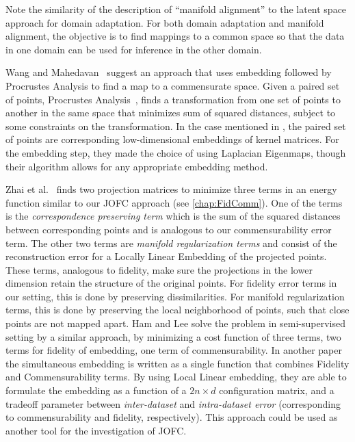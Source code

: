 \documentclass[12pt,oneside,final]{thesis}\usepackage[]{graphicx}\usepackage[]{color}
\begin{document}
Note the similarity of the  description of ``manifold alignment''   to the latent space approach for domain adaptation. For both domain adaptation and manifold alignment, the objective is to find mappings to a  common space  so that the data in  one domain can be used for inference in the other domain.

Wang and Mahedavan~\cite{Wang2008} suggest an  approach that uses embedding followed by Procrustes Analysis to find a map to a commensurate space. Given a paired set of points, Procrustes Analysis~\cite{Sibson}, finds a transformation from one set of points to another in the same space that minimizes sum of squared distances, subject to some constraints on the transformation. In the case mentioned in \cite{Wang2008}, the paired set of points are corresponding low-dimensional embeddings of kernel matrices.   For the embedding step, they made the choice of using Laplacian Eigenmaps, though their algorithm allows for any appropriate embedding method.

 Zhai et al.~\cite{Zhai2010}  finds two projection matrices to minimize three terms in an energy function similar to our JOFC approach (see \autoref{chap:FidComm}). One of the terms is the \emph{correspondence preserving term} which is the sum of the squared distances between corresponding points and is analogous to our commensurability error term. The other two terms are \emph{manifold regularization terms} and consist of the reconstruction error for a Locally Linear Embedding of the projected points. These terms, analogous to fidelity, make sure the projections in the lower dimension retain the structure of the original points. For fidelity error terms in our setting, this is done by preserving dissimilarities. For manifold regularization terms, this is done by preserving the local neighborhood of points, such that close points are not mapped apart.
Ham and Lee\cite{HamLee2005a} solve the problem in semi-supervised setting by a similar approach, by minimizing a cost function of three terms, two terms for fidelity of embedding, one term of commensurability.
In another paper  the simultaneous embedding is written  as a single function  that combines Fidelity and Commensurability terms. By using Local Linear embedding,  they are able to formulate the embedding as a function of a $2n \times d$ configuration matrix, and a tradeoff parameter between \emph{inter-dataset} and \emph{intra-dataset error} (corresponding to commensurability and fidelity, respectively). This approach could be used as another tool for the investigation of JOFC.
\end{document}
